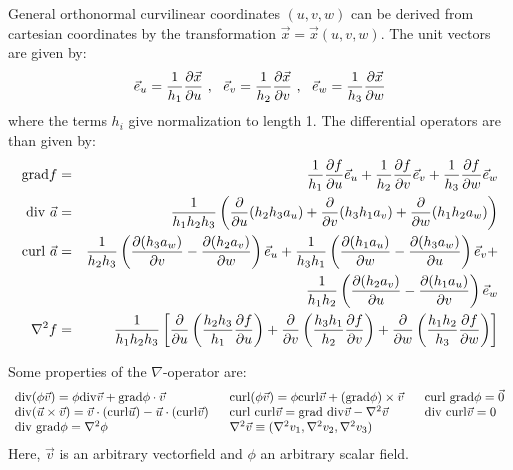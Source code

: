 \documentclass[a4paper,fancyheadings,twoside]{report}
\begin{document}
General orthonormal curvilinear coordinates $(u,v,w)$ can be derived from
cartesian coordinates by the transformation $\vec{x}=\vec{x}(u,v,w)$. The unit
vectors are given by:
\[
\vec{e}_{u}=\frac{1}{h_1}\frac{\partial \vec{x}}{\partial u}~,~~ \vec{e}_{v}=\frac{1}{h_2}\frac{\partial \vec{x}}{\partial v}~,~~
\vec{e}_{w}=\frac{1}{h_3}\frac{\partial \vec{x}}{\partial w}
\]
where the terms $h_i$ give normalization to length 1. The differential operators
are than given by:
\begin{eqnarray*}
{\rm grad}f      &=&\frac{1}{h_1}\frac{\partial f}{\partial u}\vec{e}_{u}+\frac{1}{h_2}\frac{\partial f}{\partial v}\vec{e}_{v}+\frac{1}{h_3}\frac{\partial f}{\partial w}\vec{e}_{w}\\
{\rm div}~\vec{a}&=&\frac{1}{h_1h_2h_3}\left(\frac{\partial }{\partial u}(h_2h_3a_u)+\frac{\partial }{\partial v}(h_3h_1a_v)+\frac{\partial }{\partial w}(h_1h_2a_w)\right)\\
{\rm curl}~\vec{a}&=&\frac{1}{h_2h_3}\left(\frac{\partial (h_3a_w)}{\partial v}-\frac{\partial (h_2a_v)}{\partial w}\right)\vec{e}_{u}+
                    \frac{1}{h_3h_1}\left(\frac{\partial (h_1a_u)}{\partial w}-\frac{\partial (h_3a_w)}{\partial u}\right)\vec{e}_{v}+\\
                  &&\frac{1}{h_1h_2}\left(\frac{\partial (h_2a_v)}{\partial u}-\frac{\partial (h_1a_u)}{\partial v}\right)\vec{e}_{w}\\
\nabla^2 f       &=&\frac{1}{h_1h_2h_3}\left[\frac{\partial }{\partial u}\left(\frac{h_2h_3}{h_1}\frac{\partial f}{\partial u}\right)+
                    \frac{\partial }{\partial v}\left(\frac{h_3h_1}{h_2}\frac{\partial f}{\partial v}\right)+
                    \frac{\partial }{\partial w}\left(\frac{h_1h_2}{h_3}\frac{\partial f}{\partial w}\right)\right]
\end{eqnarray*}

Some properties of the $\nabla$-operator are:
\[
\begin{array}{l@{~~~~~}l@{~~~~~}l}
{\rm div}(\phi\vec{v})=\phi{\rm div}\vec{v}+{\rm grad}\phi\cdot\vec{v}&
{\rm curl}(\phi\vec{v})=\phi{\rm curl}\vec{v}+({\rm grad}\phi)\times\vec{v}&{\rm curl~grad}\phi=\vec{0}\\
{\rm div}(\vec{u}\times\vec{v})=\vec{v}\cdot({\rm curl}\vec{u})-\vec{u}\cdot({\rm curl}\vec{v})&
{\rm curl~curl}\vec{v}={\rm grad~div}\vec{v}-\nabla^2\vec{v}&{\rm div~curl}\vec{v}=0\\
{\rm div~grad}\phi=\nabla^2\phi&\nabla^2\vec{v}\equiv(\nabla^2v_1,\nabla^2v_2,\nabla^2v_3)
\end{array}
\]
Here, $\vec{v}$ is an arbitrary vectorfield and $\phi$ an arbitrary scalar
field.
\end{document}

